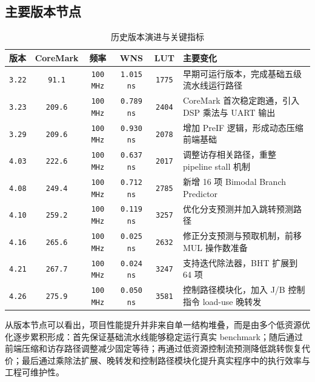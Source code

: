 ﻿\documentclass[12pt,a4paper]{ctexart}
\begin{document}
\subsection{主要版本节点}
\begin{table}[H]
    \centering
    \caption{历史版本演进与关键指标}
    \label{tab:history_version_trend}
    \begin{tabularx}{\textwidth}{lccccX}
        \toprule
        版本 & CoreMark & 频率 & WNS & LUT & 主要变化 \\
        \midrule
        \texttt{3.22} & \texttt{91.1} & \texttt{100 MHz} & \texttt{1.015 ns} & \texttt{1775} & 早期可运行版本，完成基础五级流水线运行路径 \\
        \texttt{3.23} & \texttt{209.6} & \texttt{100 MHz} & \texttt{0.789 ns} & \texttt{2404} & CoreMark 首次稳定跑通，引入 DSP 乘法与 UART 输出 \\
        \texttt{3.29} & \texttt{209.6} & \texttt{100 MHz} & \texttt{0.930 ns} & \texttt{2078} & 增加 PreIF 逻辑，形成动态压缩前端基础 \\
        \texttt{4.03} & \texttt{222.6} & \texttt{100 MHz} & \texttt{0.637 ns} & \texttt{2017} & 调整访存相关路径，重整 pipeline stall 机制 \\
        \texttt{4.08} & \texttt{249.4} & \texttt{100 MHz} & \texttt{0.712 ns} & \texttt{2785} & 新增 16 项 Bimodal Branch Predictor \\
        \texttt{4.10} & \texttt{259.2} & \texttt{100 MHz} & \texttt{0.119 ns} & \texttt{3257} & 优化分支预测并加入跳转预测路径 \\
        \texttt{4.16} & \texttt{265.6} & \texttt{100 MHz} & \texttt{0.025 ns} & \texttt{2632} & 修正分支预测与预取机制，前移 MUL 操作数准备 \\
        \texttt{4.21} & \texttt{267.7} & \texttt{100 MHz} & \texttt{0.024 ns} & \texttt{3247} & 支持迭代除法器，BHT 扩展到 64 项 \\
        \texttt{4.26} & \texttt{275.9} & \texttt{100 MHz} & \texttt{0.050 ns} & \texttt{3581} & 控制路径模块化，加入 J/B 控制指令 load-use 晚转发 \\
        \bottomrule
    \end{tabularx}
\end{table}

从版本节点可以看出，项目性能提升并非来自单一结构堆叠，而是由多个低资源优化逐步累积形成：首先保证基础流水线能够稳定运行真实 benchmark；随后通过前端压缩和访存路径调整减少固定等待；再通过低资源控制流预测降低跳转恢复代价；最后通过乘除法扩展、晚转发和控制路径模块化提升真实程序中的执行效率与工程可维护性。
\end{document}
